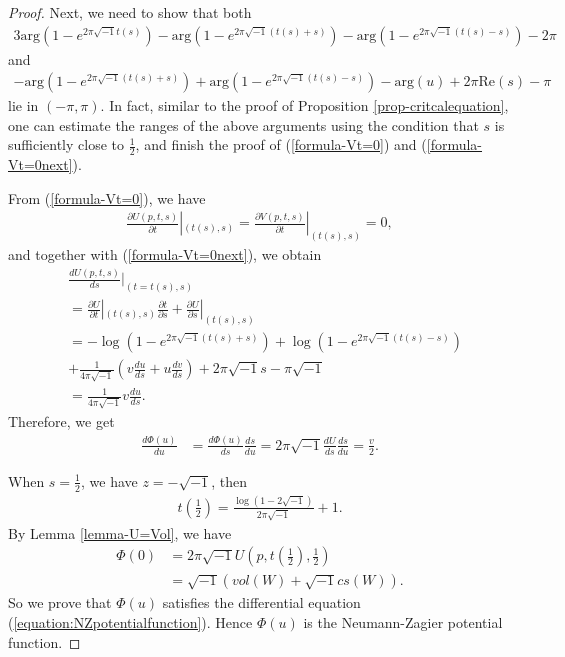 \documentclass[12pt]{amsart}
\begin{document}
\begin{proof}
Next, we need to show that both
\begin{align}
3\text{arg}(1-e^{2\pi\sqrt{-1}t(s)})-\text{arg}(1-e^{2\pi\sqrt{-1}(t(s)+s)})-\text{arg}(1-e^{2\pi\sqrt{-1}(t(s)-s)})-2\pi
\end{align}
and 
\begin{align}
-\text{arg}(1-e^{2\pi\sqrt{-1}(t(s)+s)})+\text{arg}(1-e^{2\pi\sqrt{-1}(t(s)-s)})-\text{arg}(u)+2\pi \text{Re}(s)-\pi
\end{align}
lie in $(-\pi,\pi)$. In fact, similar to the proof of Proposition \ref{prop-critcalequation}, one can estimate the ranges of the above arguments using the condition that $s$ is sufficiently close to $\frac{1}{2}$, and finish the proof of (\ref{formula-Vt=0}) and (\ref{formula-Vt=0next}).   

From (\ref{formula-Vt=0}), we have 
\begin{align}
 \frac{\partial U(p,t,s)}{\partial t}|_{(t(s),s)}= \frac{\partial V(p,t,s)}{\partial t}|_{(t(s),s)}=0,  
\end{align}
and together with (\ref{formula-Vt=0next}), we obtain
\begin{align}
     &\frac{d U(p,t,s)}{d s}|_{(t=t(s),s)}\\\nonumber
     &=\frac{\partial U}{\partial t}|_{(t(s),s)}\frac{\partial t}{\partial s}+\frac{\partial U}{\partial s}|_{(t(s),s)}\\\nonumber
     &=-\log(1-e^{2\pi\sqrt{-1}(t(s)+s)})+\log(1-e^{2\pi\sqrt{-1}(t(s)-s)})\\\nonumber
     &+\frac{1}{4\pi\sqrt{-1}}\left(v\frac{d u}{d s}+u\frac{d v}{d s}\right)+2\pi\sqrt{-1}s-\pi\sqrt{-1}\\\nonumber
     &=\frac{1}{4\pi\sqrt{-1}}v\frac{du}{ds}.
\end{align}
Therefore, we get
\begin{align}
    \frac{d \Phi(u)}{d u}&= \frac{d \Phi(u)}{d s}\frac{d s}{d u}=2\pi\sqrt{-1}\frac{dU}{ds}\frac{ds}{du}=\frac{v}{2}.
\end{align}


When $s=\frac{1}{2}$,  we have $z=-\sqrt{-1}$, then
\begin{align}
    t\left(\frac{1}{2}\right)=\frac{\log(1-2\sqrt{-1})}{2\pi\sqrt{-1}}+1.
\end{align}
By Lemma \ref{lemma-U=Vol}, we have 
\begin{align}   \Phi(0)&=2\pi\sqrt{-1}U(p,t\left(\frac{1}{2}\right),\frac{1}{2})\\\nonumber
    &= \sqrt{-1}(vol(W)+\sqrt{-1}cs(W)). 
\end{align}
So we prove that $\Phi(u)$ satisfies the differential equation (\ref{equation:NZpotentialfunction}). Hence $\Phi(u)$ is the Neumann-Zagier potential function.



\end{proof}
\end{document}
